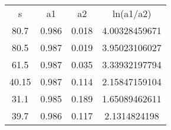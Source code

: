 \begin{table}
\begin{tabular}{cccc}
s & a1 & a2 & ln(a1/a2) \\
80.7 & 0.986 & 0.018 & 4.00328459671 \\
80.5 & 0.987 & 0.019 & 3.95023106027 \\
61.5 & 0.987 & 0.035 & 3.33932197794 \\
40.15 & 0.987 & 0.114 & 2.15847159104 \\
31.1 & 0.985 & 0.189 & 1.65089462611 \\
39.7 & 0.986 & 0.117 & 2.1314824198 \\
\end{tabular}
\end{table}

